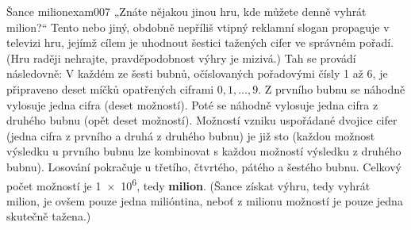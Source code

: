 \begin{mathexam}{Šance milion}{exam007}
  „Znáte nějakou jinou hru, kde můžete denně vyhrát milion?“ Tento nebo jiný, obdobně nepříliš
  vtipný reklamní slogan propaguje v televizi hru, jejímž cílem je uhodnout šestici tažených cifer
  ve správném pořadí. (Hru raději nehrajte, pravděpodobnost výhry je mizivá.) Tah se provádí
  následovně: V každém ze šesti bubnů, očíslovaných pořadovými čísly \num{1} až \num{6}, je
  připraveno deset míčků opatřených ciframi \(0, 1, \ldots, 9\). Z prvního bubnu se náhodně vylosuje
  jedna cifra (deset možností). Poté se náhodně vylosuje jedna cifra z druhého bubnu (opět deset
  možností). Možností vzniku uspořádané dvojice cifer (jedna cifra z prvního a druhá z druhého
  bubnu) je již sto (každou možnost výsledku u prvního bubnu lze kombinovat s každou možností
  výsledku z druhého bubnu). Losování pokračuje u třetího, čtvrtého, pátého a šestého bubnu. Celkový
  počet možností je \num{1e6}, tedy \textbf{milion}. (Šance získat výhru, tedy vyhrát milion, je
  ovšem pouze jedna milióntina, neboť z milionu možností je pouze jedna skutečně tažena.) 
\end{mathexam}